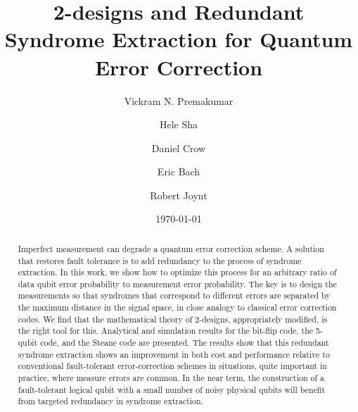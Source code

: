 \documentclass[reprint, superscriptaddress]{revtex4-1}
\numberwithin{equation}{section}
\numberwithin{figure}{section}
\numberwithin{table}{section}
\begin{document}
\title{ 2-designs and Redundant Syndrome Extraction for Quantum Error Correction }
\author{Vickram N. Premakumar}
\address{Physics Department, University of Wisconsin-Madison, 1150 Univ. Ave., Madison, WI, USA}
\author{Hele Sha}
\address{Physics Department, University of Wisconsin-Madison, 1150 Univ. Ave., Madison, WI, USA}
\author{Daniel Crow}
\address{Physics Department, University of Wisconsin-Madison, 1150 Univ. Ave., Madison, WI, USA}
\author{Eric Bach}
\address{Computer Science Department, University of Wisconsin-Madison, Madison, WI, USA}
\author{Robert Joynt}
\address{Physics Department, University of Wisconsin-Madison, 1150 Univ. Ave., Madison, WI, USA}
\address{
Kavli Institute for Theoretical Sciences, University of Chinese Academy of Sciences, Beijing 100190, China}
\date{{\normalsize \today}}

\begin{abstract}
Imperfect measurement can degrade a quantum error correction scheme.  A solution that restores fault tolerance is to add redundancy to the process of syndrome extraction.  In this work, we show how to optimize this process for an arbitrary ratio of data qubit error probability to measurement error probability.  The key is to design the measurements so that syndromes that correspond to different errors are separated by the maximum distance in the signal space, in close analogy to classical error correction codes.  We find that the mathematical theory of 2-designs, appropriately modified, is the right tool for this.  Analytical and simulation results for the bit-flip code, the 5-qubit code, and the Steane code are presented. The results show that this redundant syndrome extraction shows an improvement in both cost and performance relative to conventional fault-tolerant error-correction schemes in situations, quite important in practice, where measure errors are common. In the near term, the construction of a fault-tolerant logical qubit with a small number of noisy physical qubits will benefit from targeted redundancy in syndrome extraction.       
\end{abstract}

\maketitle

\end{document}
